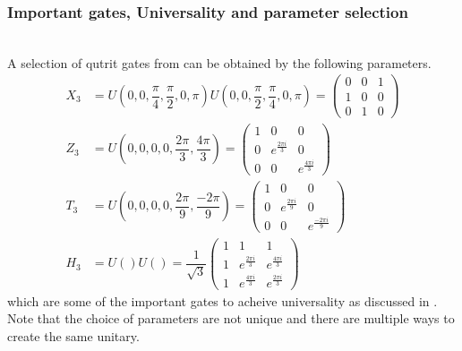 \subsubsection{Important gates, Universality and parameter selection}
\\
A selection of qutrit gates from \cite{qudit} can be obtained by the following parameters.\\
\begin{equation}
\begin{aligned}
X_3 &= U(0,0,\dfrac{\pi}{4},\dfrac{\pi}{2},0,\pi)U(0,0,\dfrac{\pi}{2},\dfrac{\pi}{4},0,\pi) 
= \begin{pmatrix}
0&0&1
\\
1&0&0
\\
0&1&0
\end{pmatrix}
\\ 
Z_3 &= U(0,0,0,0,\dfrac{2\pi}{3},\dfrac{4\pi}{3})
= \begin{pmatrix}
1&0&0
\\
0&e^{\frac{2\pi i}{3}}&0
\\
0&0&e^{\frac{4\pi i}{3}}
\end{pmatrix}
\\
T_3 &= U(0,0,0,0,\dfrac{2\pi}{9},\dfrac{-2\pi}{9})
= \begin{pmatrix}
1&0&0
\\
0&e^{\frac{2\pi i}{9}}&0
\\
0&0&e^{\frac{-2\pi i}{9}}
\end{pmatrix}
\\
H_3 &= U()U() 
= \dfrac{1}{\sqrt{3}}\begin{pmatrix}
1&1&1
\\
1&e^{\frac{2\pi i}{3}}&e^{\frac{4\pi i}{3}}
\\
1&e^{\frac{4\pi i}{3}}&e^{\frac{2\pi i}{3}}
\end{pmatrix}
\end{aligned}
\end{equation}
which are some of the important gates to acheive universality\cite{qudit} as discussed in . Note that the choice of parameters are not unique and there are multiple ways to create the same unitary.

